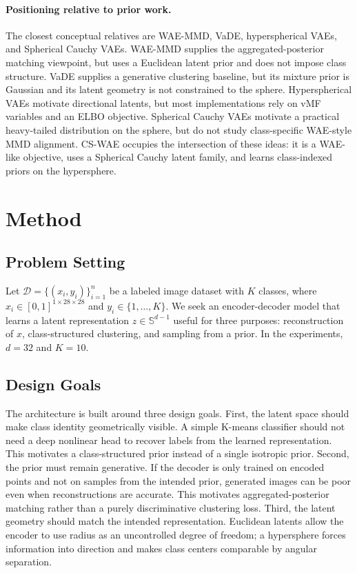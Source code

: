 \documentclass[10pt]{article}
\begin{document}
\paragraph{Positioning relative to prior work.}
The closest conceptual relatives are WAE-MMD, VaDE, hyperspherical VAEs, and Spherical Cauchy VAEs. WAE-MMD supplies the aggregated-posterior matching viewpoint, but uses a Euclidean latent prior and does not impose class structure. VaDE supplies a generative clustering baseline, but its mixture prior is Gaussian and its latent geometry is not constrained to the sphere. Hyperspherical VAEs motivate directional latents, but most implementations rely on vMF variables and an ELBO objective. Spherical Cauchy VAEs motivate a practical heavy-tailed distribution on the sphere, but do not study class-specific WAE-style MMD alignment. CS-WAE occupies the intersection of these ideas: it is a WAE-like objective, uses a Spherical Cauchy latent family, and learns class-indexed priors on the hypersphere.

\section{Method}

\subsection{Problem Setting}

Let $\mathcal{D}=\{(x_i,y_i)\}_{i=1}^{n}$ be a labeled image dataset with $K$ classes, where $x_i\in[0,1]^{1\times 28\times 28}$ and $y_i\in\{1,\dots,K\}$. We seek an encoder-decoder model that learns a latent representation $z\in\mathbb{S}^{d-1}$ useful for three purposes: reconstruction of $x$, class-structured clustering, and sampling from a prior. In the experiments, $d=32$ and $K=10$.

\subsection{Design Goals}

The architecture is built around three design goals.
First, the latent space should make class identity geometrically visible. A simple K-means classifier should not need a deep nonlinear head to recover labels from the learned representation. This motivates a class-structured prior instead of a single isotropic prior.
Second, the prior must remain generative. If the decoder is only trained on encoded points and not on samples from the intended prior, generated images can be poor even when reconstructions are accurate. This motivates aggregated-posterior matching rather than a purely discriminative clustering loss.
Third, the latent geometry should match the intended representation. Euclidean latents allow the encoder to use radius as an uncontrolled degree of freedom; a hypersphere forces information into direction and makes class centers comparable by angular separation.
\end{document}
